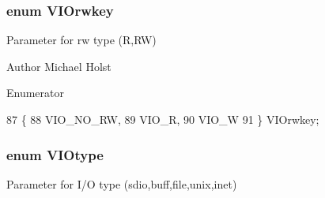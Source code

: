 \subsubsection[{V\+I\+Orwkey}]{\setlength{\rightskip}{0pt plus 5cm}enum {\bf V\+I\+Orwkey}}\label{a00028_gaf7330032d12db3359c24f79c9c2d4e24}


Parameter for rw type (R,R\+W) 

\begin{DoxyAuthor}{Author}
Michael Holst 
\end{DoxyAuthor}
\begin{Desc}
\item[Enumerator]\par
\begin{description}
\item[{\em 
V\+I\+O\+\_\+\+N\+O\+\_\+\+R\+W\label{a00028_ggaf7330032d12db3359c24f79c9c2d4e24a728233ece268770e6c75232bf7da1968}
}]\item[{\em 
V\+I\+O\+\_\+\+R\label{a00028_ggaf7330032d12db3359c24f79c9c2d4e24af463196c138c83145f7258caf84a6d92}
}]\item[{\em 
V\+I\+O\+\_\+\+W\label{a00028_ggaf7330032d12db3359c24f79c9c2d4e24a89e0bf28fada4387e3440bc18839818a}
}]\end{description}
\end{Desc}

\begin{DoxyCode}
87                       \{
88     VIO_NO_RW,
89     VIO_R,
90     VIO_W
91 \} VIOrwkey;
\end{DoxyCode}
\subsubsection[{V\+I\+Otype}]{\setlength{\rightskip}{0pt plus 5cm}enum {\bf V\+I\+Otype}}\label{a00028_gac54f991a41350084c7880d7f6192eeb9}


Parameter for I/\+O type (sdio,buff,file,unix,inet) 

